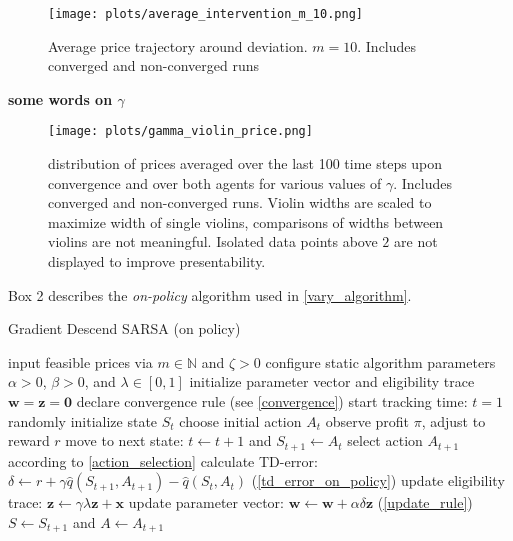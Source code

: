 \begin{figure}
	\texttt{[image: plots/average\_intervention\_m\_10.png]}
	\caption{Average price trajectory around deviation. $m=10$. Includes converged and non-converged runs}
	\label{average_intervention_m_10}
\end{figure}




\textbf{some words on $\gamma$}

\begin{figure}
	\texttt{[image: plots/gamma\_violin\_price.png]}
	\caption{distribution of prices averaged over the last 100 time steps upon convergence and over both agents for various values of $\gamma$. Includes converged and non-converged runs. Violin widths are scaled to maximize width of single violins, comparisons of widths between violins are not meaningful. Isolated data points above $2$ are not displayed to improve presentability.}
	\label{gamma_violin_price}
\end{figure}








\pagebreak

Box 2 describes the \emph{on-policy} algorithm used in \autoref{vary_algorithm}.

\begin{algorithm}
	\caption{Gradient Descend SARSA (on policy)}
	\begin{algorithmic}[]
		\label{SARSA}
		\small
		\STATE input feasible prices via $m \in \mathbb{N}$ and $\zeta > 0$
		\STATE configure static algorithm parameters $\alpha > 0$, $\beta > 0$, and $\lambda \in [0, 1]$
		\STATE initialize parameter vector and eligibility trace $\boldsymbol{w} = \boldsymbol{z} = \boldsymbol{0}$
		\STATE declare convergence rule (see \autoref{convergence})
		\STATE start tracking time: $t = 1$
		\STATE randomly initialize state $S_t$
		\STATE choose initial action $A_t$
		\STATE observe profit $\pi$, adjust to reward $r$
		\STATE move to next state: $t \leftarrow t+1$ and $S_{t+1} \leftarrow A_t$
		\STATE select action $A_{t+1}$ according to \autoref{action_selection}
		\STATE calculate TD-error: $\delta \leftarrow r + \gamma \hat{q}(S_{t+1}, A_{t+1}) - \hat{q}(S_t, A_t)$ (\autoref{td_error_on_policy})
		\STATE update eligibility trace: $\boldsymbol{z} \leftarrow \gamma \lambda \boldsymbol{z} + \boldsymbol{x}$
		\STATE update parameter vector: $\boldsymbol{w} \leftarrow \boldsymbol{w} + \alpha  \delta  \boldsymbol{z}$ (\autoref{update_rule})
		\STATE $S \leftarrow S_{t+1}$ and $A \leftarrow A_{t+1}$
		\ENDWHILE
	\end{algorithmic}
\end{algorithm}

